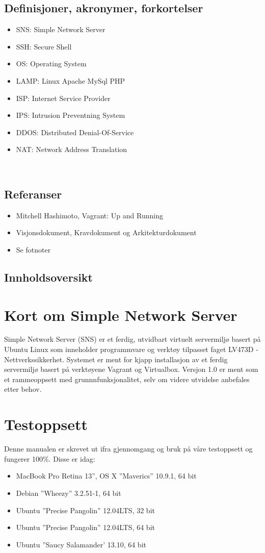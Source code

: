 \documentclass{article}
\begin{document}
\subsection{Definisjoner, akronymer, forkortelser}
\begin{itemize}
\item SNS: Simple Network Server
\item SSH: Secure Shell
\item OS: Operating System
\item LAMP: Linux Apache MySql PHP
\item ISP: Internet Service Provider
\item IPS: Intrusion Preventning System
\item DDOS: Distributed Denial-Of-Service
\item NAT: Network Address Translation
\end{itemize}
\\
\subsection{Referanser}
\begin{itemize}
\item{Mitchell Hashimoto, Vagrant: Up and Running}
\item Visjonsdokument, Kravdokument og Arkitekturdokument
\item Se fotnoter
\end{itemize}
\subsection{Innholdsoversikt}
\section{Kort om Simple Network Server}
Simple Network Server (SNS) er et ferdig, utvidbart virtuelt servermiljø basert på Ubuntu Linux som inneholder programmvare og verktøy tilpasset faget LV473D -Nettverkssikkerhet. Systemet er ment for kjapp installasjon av et ferdig servermiljø basert på verktøyene Vagrant og Virtualbox. Versjon 1.0 er ment som et rammeoppsett med grunnnfunksjonalitet, selv om videre utvidelse anbefales etter behov.
\section{Testoppsett}
Denne manualen er skrevet ut ifra gjennomgang og bruk på våre testoppsett og fungerer 100\%. Disse er idag: 
\begin{itemize}
\item MacBook Pro Retina 13'', OS X  ''Maverics'' 10.9.1, 64 bit
\item Debian ''Wheezy'' 3.2.51-1, 64 bit
\item Ubuntu ''Precise Pangolin'' 12.04LTS, 32 bit
\item Ubuntu ''Precise Pangolin'' 12.04LTS, 64 bit
\item Ubuntu ''Saucy Salamander' 13.10, 64 bit
\end{itemize}
\end{document}
